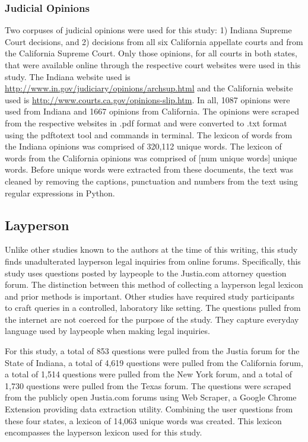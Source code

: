 \documentclass[11pt]{article}
\begin{document}
\subsubsection{Judicial Opinions}
Two corpuses of judicial opinions were used for this study: 1) Indiana Supreme Court decisions, and 2) decisions from all six California appellate courts and from the California Supreme Court.  Only those opinions, for all courts in both states, that were available online through the respective court websites were used in this study.  The Indiana website used is \url{http://www.in.gov/judiciary/opinions/archsup.html}  and the California website used is \url{http://www.courts.ca.gov/opinions-slip.htm}.  In all, 1087 opinions were used from Indiana and 1667 opinions from California.  The opinions were scraped from the respective websites in .pdf format and were converted to .txt format using the pdftotext tool and commands in terminal.  The lexicon of words from the Indiana opinions was comprised of 320,112 unique words.  The lexicon of words from the California opinions was comprised of [num unique words] unique words.  Before unique words were extracted from these documents, the text was cleaned by removing the captions, punctuation and numbers from the text using regular expressions in Python.  
\subsection{Layperson}
Unlike other studies known to the authors at the time of this writing, this study finds unadulterated layperson legal inquiries from online forums.  Specifically, this study uses questions posted by laypeople to the Justia.com attorney question forum.  The distinction between this method of collecting a layperson legal lexicon and prior methods is important.  Other studies have required study participants to craft queries in a controlled, laboratory like setting.  The questions pulled from the internet are not coerced for the purpose of the study.  They capture everyday language used by laypeople when making legal inquiries.  

For this study, a total of 853 questions were pulled from the Justia forum for the State of Indiana, a total of 4,619 questions were pulled from the California forum, a total of 1,514 questions were pulled from the New York forum, and a total of 1,730 questions were pulled from the Texas forum.  The questions were scraped from the publicly open Justia.com forums using Web Scraper, a Google Chrome Extension providing data extraction utility.  Combining the user questions from these four states, a lexicon of 14,063 unique words was created.  This lexicon encompasses the layperson lexicon used for this study.
\end{document}
